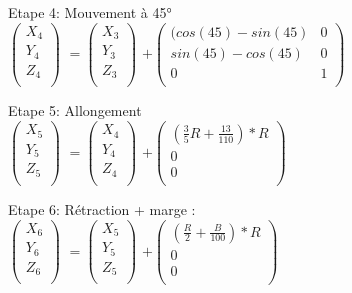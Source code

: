 Etape 4: Mouvement à 45° \\

$
\begin{pmatrix}
  X_{4} \\
  Y_{4} \\
  Z_{4} \\
\end{pmatrix}
$
\vspace{5mm} %
$
=
\begin{pmatrix}
  X_{3} \\
  Y_{3} \\
  Z_{3} \\
\end{pmatrix}
$
\vspace{5mm} %
$
 +
\begin{pmatrix}
 (cos(45)-sin(45) & 0 \\
  sin(45)-cos(45) & 0\\
  0 & 1 \\
\end{pmatrix}
$

Etape 5: Allongement \\

$
\begin{pmatrix}
  X_{5} \\
  Y_{5} \\
  Z_{5} \\
\end{pmatrix}
$
\vspace{5mm} %
$
=
\begin{pmatrix}
  X_{4} \\
  Y_{4} \\
  Z_{4} \\
\end{pmatrix}
$
\vspace{5mm} %
$
 +
\begin{pmatrix}
  (\frac{3}{5}R + \frac{13}{110})*R  \\
  0 \\
  0 \\
\end{pmatrix}
$

Etape 6: Rétraction + marge : \\

$
\begin{pmatrix}
  X_{6} \\
  Y_{6} \\
  Z_{6} \\
\end{pmatrix}
$
\vspace{5mm} %
$
=
\begin{pmatrix}
  X_{5} \\
  Y_{5} \\
  Z_{5} \\
\end{pmatrix}
$
\vspace{5mm} %
$
 +
\begin{pmatrix}
  (\frac{R}{2} + \frac{B}{100})*R  \\
  0 \\
  0 \\
\end{pmatrix}
$

